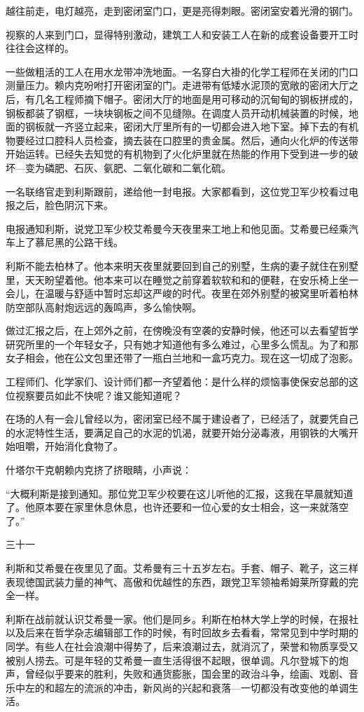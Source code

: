 越往前走，电灯越亮，走到密闭室门口，更是亮得刺眼。密闭室安着光滑的钢门。

视察的人来到门口，显得特别激动，建筑工人和安装工人在新的成套设备要开工时往往会这样的。

一些做粗活的工人在用水龙带冲洗地面。一名穿白大褂的化学工程师在关闭的门口测量压力。赖内克吩咐打开密闭室的门。走进带有低矮水泥顶的宽敞的密闭大厅之后，有几名工程师摘下帽子。密闭大厅的地面是用可移动的沉甸甸的钢板拼成的，钢板都装了钢框，一块块钢板之间不见缝隙。在调度人员开动机械装置的时候，地面的钢板就一齐竖立起来，密闭大厅里所有的一切都会进入地下室。掉下去的有机物要经过口腔科人员检查，摘去装在口腔里的贵金属。然后，通向火化炉的传送带开始运转。已经失去知觉的有机物到了火化炉里就在热能的作用下受到进一步的破坏—变为磷肥、石灰、氨肥、二氧化碳和二氧化硫。

一名联络官走到利斯跟前，递给他一封电报。大家都看到，这位党卫军少校看过电报之后，脸色阴沉下来。

电报通知利斯，说党卫军少校艾希曼今天夜里来工地上和他见面。艾希曼已经乘汽车上了慕尼黑的公路干线。

利斯不能去柏林了。他本来明天夜里就要回到自己的别墅，生病的妻子就住在别墅里，天天盼望着他。他本来可以在睡觉之前穿着软软和和的便鞋，在安乐椅上坐一会儿，在温暖与舒适中暂时忘却这严峻的时代。夜里在郊外别墅的被窝里听着柏林防空部队高射炮远远的轰鸣声，多么愉快啊。

做过汇报之后，在上郊外之前，在傍晚没有空袭的安静时候，他还可以去看望哲学研究所里的一个年轻女子，只有她才知道他有多么难过，心里多么慌乱。为了和那女子相会，他在公文包里还带了一瓶白兰地和一盒巧克力。现在这一切成了泡影。

工程师们、化学家们、设计师们都一齐望着他：是什么样的烦恼事使保安总部的这位视察要员如此不快呢？谁又能知道呢？

在场的人有一会儿曾经以为，密闭室已经不属于建设者了，已经活了，就要凭自己的水泥特性生活，要满足自己的水泥的饥渴，就要开始分泌毒液，用钢铁的大嘴开始咀嚼，开始消化食物了。

什塔尔干克朝赖内克挤了挤眼睛，小声说：

“大概利斯是接到通知。那位党卫军少校要在这儿听他的汇报，这我在早晨就知道了。他原本要在家里休息休息，也许还要和一位心爱的女士相会，这一来就落空了。”

三十一

利斯和艾希曼在夜里见了面。艾希曼有三十五岁左右。手套、帽子、靴子，这三样表现徳国武装力量的神气、高傲和优越性的东西，跟党卫军领袖希姆莱所穿戴的完全一样。

利斯在战前就认识艾希曼一家。他们是同乡。利斯在柏林大学上学的时候，在报社以及后来在哲学杂志编辑部工作的时候，有时回故乡去看看，常常见到中学时期的同学。有些人在社会浪潮中得势了，后来浪潮过去，就消沉了，荣誉和物质享受又被别人捞去。可是年轻的艾希曼一直生活得很不起眼，很单调。凡尔登城下的炮声，曾经似乎要来的胜利，失败和通货膨胀，国会里的政治斗争，绘画、戏剧、音乐中左的和超左的流派的冲击，新风尚的兴起和衰落—一切都没有改变他的单调生活。

